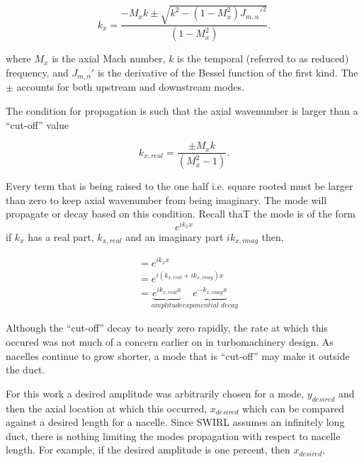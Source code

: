 \documentclass[a4paper]{report}
\begin{document}
\begin{equation}
    k_x  = \frac{- M_x k \pm \sqrt{k^2 - ( 1 - M_x^2) J_{m,n}'^2 }}{\left( 1 - M_x^2 \right)}.
    \label{eqn:ax_wavenumb}
\end{equation}

where $M_x$ is the axial Mach number, $k$ is the temporal (referred to as reduced)
frequency, and $J_{m,n}'$ is the derivative of the Bessel function of the first kind.  
The $\pm$ accounts for both upstream and downstream modes.

The condition for propagation is such that the axial wavenumber is larger than 
a ``cut-off'' value

\begin{equation}
    k_{x,real}  = \frac{\pm M_x k }{\left( M_x^2 - 1 \right)}.
    \label{eqn:cuton}
\end{equation}

Every term that is being raised to the one half i.e. square rooted must 
be larger than zero to keep axial wavenumber from being imaginary. The mode 
will propagate or decay based on this condition. Recall thaT the mode is of the 
form 
\begin{equation}
    e^{i k_x x}
    \label{eqn:fluctuationexample}
\end{equation}
if $k_x$ has a real part, $k_{x,real}$ and an imaginary part $i k_{x,imag}$ 
then,

\begin{align}
    &= e^{i k_x x} \\
    &= e^{i (k_{x,real}+ i k_{x,imag}) x} \\
    &= \underbrace{e^{i k_{x,real}x}}_{\textit{amplitude}} \underbrace{e^{- k_{x,imag} x}}_{\textit{exponential decay}} 
\end{align}

Although the ``cut-off'' decay to nearly zero rapidly, the rate at which this occured
was not much of a concern earlier on in turbomachinery design. As nacelles 
continue to grow shorter, a mode that is ``cut-off'' may make it outside the duct.

For this work a desired amplitude was arbitrarily chosen for a mode, $y_{desired}$
and then the axial location at which this occurred, $x_{desired}$ which 
can be compared against a desired length for a nacelle.  
Since SWIRL assumes an infinitely long duct, there is nothing limiting the 
modes propagation with respect to nacelle length. For example, if the 
desired amplitude is one percent, then $x_{desired}$,
\end{document}
